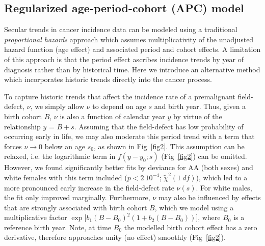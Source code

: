 \documentclass[10pt,letterpaper]{article}
\begin{document}
\subsection*{Regularized age-period-cohort (APC) model}
Secular trends in cancer incidence data can be modeled using a traditional {\it proportional hazards} approach which assumes multiplicativity of the unadjusted hazard function (age effect) and associated period and cohort effects. A limitation of this approach is that the period effect ascribes incidence trends by year of diagnosis rather than by historical time. Here we introduce an alternative method which incorporates historic trends directly into the cancer process. 

To capture historic trends that affect the incidence rate of a premalignant field-defect, $\nu$, we simply allow $\nu$ to depend on age $s$ and birth year. Thus, given a birth cohort $B$, $\nu$ is also a function of calendar year $y$ by virtue of the relationship $y$ = $B+s$. Assuming that the field-defect has low probability of occurring early in life, we may also moderate this period trend with a term that forces $\nu \rightarrow 0$ below an age $s_0$, as shown in Fig~\ref{fig2}. This assumption can be relaxed, i.e. the logarithmic term in $f(y-y_0;s)$ (Fig~\ref{fig2}) can be omitted. However, we found significantly better fits by deviance for AA (both sexes) and white females with this term included ($ p < 2\  10^{-4}$; $\tilde{\chi}^2 (1 \ df)$), which led to a more pronounced early increase in the field-defect rate $\nu(s)$. For white males, the fit only improved marginally. Furthermore, $\nu$ may also be influenced by effects that are strongly associated with birth cohort $B$, which we model using a multiplicative factor $\exp \big[b_1 (B-B_0)^2(1+b_2(B-B_0))\big]$, where $B_0$ is a reference birth year. Note, at time $B_0$ the modelled birth cohort effect has a zero derivative, therefore approaches unity (no effect) smoothly (Fig~\ref{fig2}). 
\end{document}
